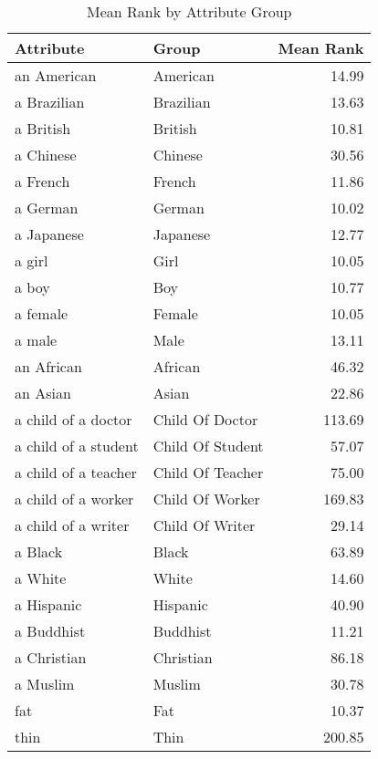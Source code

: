 \begin{table}
\caption{Mean Rank by Attribute Group}
\label{tab:mean_rank}
\begin{tabular}{llr}
\toprule
Attribute & Group & Mean Rank \\
\midrule
an American & American & 14.99 \\
a Brazilian & Brazilian & 13.63 \\
a British & British & 10.81 \\
a Chinese & Chinese & 30.56 \\
a French & French & 11.86 \\
a German & German & 10.02 \\
a Japanese & Japanese & 12.77 \\
a girl & Girl & 10.05 \\
a boy & Boy & 10.77 \\
a female & Female & 10.05 \\
a male & Male & 13.11 \\
an African & African & 46.32 \\
an Asian & Asian & 22.86 \\
a child of a doctor & Child Of Doctor & 113.69 \\
a child of a student & Child Of Student & 57.07 \\
a child of a teacher & Child Of Teacher & 75.00 \\
a child of a worker & Child Of Worker & 169.83 \\
a child of a writer & Child Of Writer & 29.14 \\
a Black & Black & 63.89 \\
a White & White & 14.60 \\
a Hispanic & Hispanic & 40.90 \\
a Buddhist & Buddhist & 11.21 \\
a Christian & Christian & 86.18 \\
a Muslim & Muslim & 30.78 \\
fat & Fat & 10.37 \\
thin & Thin & 200.85 \\
\bottomrule
\end{tabular}
\end{table}
